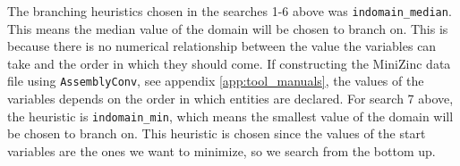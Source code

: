    The branching heuristics chosen in the searches 1-6 above was \texttt{indomain\_median}. This means the median value of the domain will be chosen to branch on. This is because there is no numerical relationship between the value the variables can take and the order in which they should come. If constructing the MiniZinc data file using \texttt{AssemblyConv}, see appendix \ref{app:tool_manuals}, the values of the variables depends on the order in which entities are declared. For search 7 above, the heuristic is \texttt{indomain\_min}, which means the smallest value of the domain will be chosen to branch on. This heuristic is chosen since the values of the start variables are the ones we want to minimize, so we search from the bottom up.
